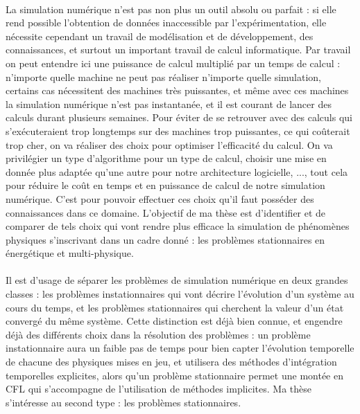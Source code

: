 		\paragraph{}
		La simulation numérique n'est pas non plus un outil absolu ou parfait : si elle rend possible l'obtention de données inaccessible par l'expérimentation, elle nécessite cependant un travail de modélisation et de développement, des connaissances, et surtout un important travail de calcul informatique.
		Par travail on peut entendre ici une puissance de calcul multiplié par un temps de calcul : n'importe quelle machine ne peut pas réaliser n'importe quelle simulation, certains cas nécessitent des machines très puissantes, et même avec ces machines la simulation numérique n'est pas instantanée, et il est courant de lancer des calculs durant plusieurs semaines.
		Pour éviter de se retrouver avec des calculs qui s'exécuteraient trop longtemps sur des machines trop puissantes, ce qui coûterait trop cher, on va réaliser des choix pour optimiser l'efficacité du calcul.
		On va privilégier un type d'algorithme pour un type de calcul, choisir une mise en donnée plus adaptée qu'une autre pour notre architecture logicielle, ..., tout cela pour réduire le coût en temps et en puissance de calcul de notre simulation numérique.
		C'est pour pouvoir effectuer ces choix qu'il faut posséder des connaissances dans ce domaine.
		L'objectif de ma thèse est d'identifier et de comparer de tels choix qui vont rendre plus efficace la simulation de phénomènes physiques s'inscrivant dans un cadre donné : les problèmes stationnaires en énergétique et multi-physique.

		\paragraph{}
		Il est d'usage de séparer les problèmes de simulation numérique en deux grandes classes : les problèmes instationnaires qui vont décrire l'évolution d'un système au cours du temps, et les problèmes stationnaires qui cherchent la valeur d'un état convergé du même système.
		Cette distinction est déjà bien connue, et engendre déjà des différents choix dans la résolution des problèmes : un problème instationnaire aura un faible pas de temps pour bien capter l'évolution temporelle de chacune des physiques mises en jeu, et utilisera des méthodes d'intégration temporelles explicites, alors qu'un problème stationnaire permet une montée en CFL qui s'accompagne de l'utilisation de méthodes implicites.
		Ma thèse s'intéresse au second type : les problèmes stationnaires.


